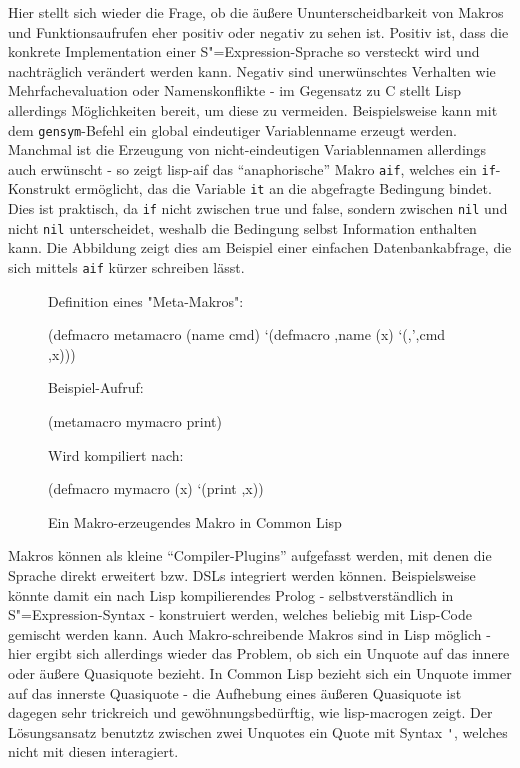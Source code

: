\documentclass[11pt, a4paper, bibgerm]{scrbook}
\newcommand\icode[1]{\lstinline?#1?}
\newcommand\abb{}
\newcommand{\sexp}{S"=Expression}
\begin{document}
Hier stellt sich wieder die Frage, ob die äußere Ununterscheidbarkeit
von Makros und Funktionsaufrufen eher positiv oder negativ zu sehen
ist. Positiv ist, dass die konkrete Implementation einer \sexp{}-Sprache
so versteckt wird und nachträglich verändert werden kann. Negativ sind
unerwünschtes Verhalten wie Mehrfachevaluation oder Namenskonflikte - im
Gegensatz zu C stellt Lisp allerdings Möglichkeiten bereit, um diese zu
vermeiden. Beispielsweise kann mit dem \icode{gensym}-Befehl ein global
eindeutiger Variablenname erzeugt werden. Manchmal ist die
Erzeugung von nicht-eindeutigen Variablennamen allerdings auch erwünscht - so
zeigt \abb{lisp-aif} das "`anaphorische"' Makro
\icode{aif}\cite{OnLisp}, welches ein \icode{if}-Konstrukt ermöglicht,
das die Variable \icode{it} an die abgefragte Bedingung bindet. Dies ist
praktisch, da \icode{if} nicht zwischen true und false, sondern zwischen
\icode{nil} und nicht \icode{nil} unterscheidet, weshalb die Bedingung
selbst Information enthalten kann. Die Abbildung zeigt dies am Beispiel
einer einfachen Datenbankabfrage, die sich mittels \icode{aif} kürzer
schreiben lässt.

\begin{figure}[h]
  \centering
  \begin{code}
Definition eines "Meta-Makros":

(defmacro metamacro (name cmd)
  `(defmacro ,name (x)
     `(,',cmd ,x)))    

Beispiel-Aufruf:

(metamacro mymacro print)

Wird kompiliert nach:

(defmacro mymacro (x)
  `(print ,x))
  \end{code}
  \caption{Ein Makro-erzeugendes Makro in Common Lisp}
  \label{magicl:fig:lisp-macrogen}
\end{figure}

Makros können als kleine "`Compiler-Plugins"' aufgefasst werden, mit
denen die Sprache direkt erweitert bzw. DSLs integriert werden
können. Beispielsweise könnte damit ein nach Lisp kompilierendes
Prolog\cite[S.388ff]{NorvigCL} - selbstverständlich in \sexp{}-Syntax -
konstruiert werden, welches beliebig mit Lisp-Code gemischt werden
kann. Auch Makro-schreibende Makros sind in Lisp möglich - hier ergibt
sich allerdings wieder das Problem, ob sich ein Unquote auf das innere
oder äußere Quasiquote bezieht. In Common Lisp bezieht sich ein Unquote
immer auf das innerste Quasiquote - die Aufhebung eines äußeren
Quasiquote ist dagegen sehr trickreich und gewöhnungsbedürftig, wie
\abb{lisp-macrogen} zeigt. Der Lösungsansatz benutztz zwischen zwei
Unquotes ein Quote mit Syntax \icode{'}, welches nicht mit diesen
interagiert.
\end{document}
